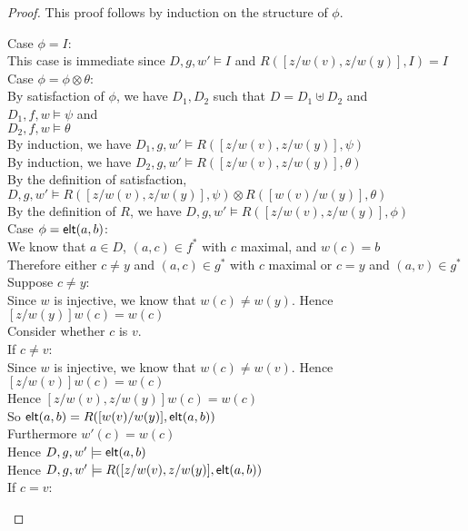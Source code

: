 \begin{proof}
This proof follows by induction on the structure of $\phi$. 

\begin{tabbedproof}
\oo Case $\phi = I$: \\
\ooo This case is immediate since $D, g, w' \models I$  and $R([z/w(v), z/w(y)],I) = I$ \\
\oo Case $\phi = \phi \otimes \theta$: \\
\ooo By satisfaction of $\phi$, we have $D_1, D_2$ such that $D = D_1 \uplus D_2$ and \\
\ooox $D_1, f, w \models \psi$ and\\
\ooox $D_2, f, w \models \theta$ \\
\ooo By induction, we have $D_1, g, w' \models R([z/w(v), z/w(y)], \psi)$ \\ 
\ooo By induction, we have $D_2, g, w' \models R([z/w(v), z/w(y)], \theta)$ \\ 
\ooo By the definition of satisfaction, $D, g, w' \models  R([z/w(v), z/w(y)], \psi)\otimes R([w(v)/w(y)], \theta)$ \\ 
\ooo By the definition of $R$, we have $D, g, w' \models  R([z/w(v), z/w(y)], \phi)$  \\
\oo Case $\phi = \mathsf{elt}({a}, {b})$: \\
\ooo We know that $a \in D$, $(a,c) \in f^*$ with $c$ maximal, and $w(c) = b$ \\
\ooo Therefore either $c \not= y$ and $(a,c) \in g^*$ with $c$ maximal or $c = y$ and $(a, v) \in g^*$ \\
\ooo Suppose $c \not= y$: \\
\oooo Since $w$ is injective, we know that $w(c) \not= w(y)$. Hence $[z/w(y)]w(c) = w(c)$ \\
\oooo Consider whether $c$ is $v$.  \\
\oooo If $c \not= v$:  \\
\ooooo Since $w$ is injective, we know that $w(c) \not= w(v)$. Hence $[z/w(v)]w(c) = w(c)$ \\
\ooooo Hence $[z/w(v), z/w(y)]w(c) = w(c)$ \\
\ooooo So $\mathsf{elt}({a}, {b}) = R([w(v)/w(y)], \mathsf{elt}({a}, {b}))$ \\
\ooooo Furthermore $w'(c) = w(c)$ \\
\ooooo Hence $D, g, w' \models \mathsf{elt}({a}, {b})$ \\
\ooooo Hence $D, g, w' \models R([z/w(v), z/w(y)], \mathsf{elt}({a}, {b}))$ \\
\oooo If $c = v$: \\

\end{tabbedproof}
\end{proof}
